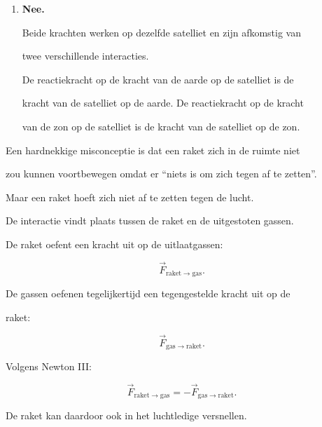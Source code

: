 \documentclass{ximera}
\begin{document}
\begin{oefening}{\oefB\ESS}
\begin{oplossing}
\begin{enumerate}
  \[\vec F_{\mathrm{auto}\rightarrow\mathrm{aanhangwagen}} = -\vec F_{\mathrm{aanhangwagen}\rightarrow\mathrm{auto}}.\]

  \item \textbf{Nee.}

  Beide krachten werken op dezelfde satelliet en zijn afkomstig van

  twee verschillende interacties.

  De reactiekracht op de kracht van de aarde op de satelliet is de

  kracht van de satelliet op de aarde. De reactiekracht op de kracht

  van de zon op de satelliet is de kracht van de satelliet op de zon.

\end{enumerate}

\end{oplossing}

\end{oefening}






Een hardnekkige misconceptie is dat een raket zich in de ruimte niet

zou kunnen voortbewegen omdat er ``niets is om zich tegen af te zetten''.

Maar een raket hoeft zich niet af te zetten tegen de lucht.

De interactie vindt plaats tussen de raket en de uitgestoten gassen.

De raket oefent een kracht uit op de uitlaatgassen:

\[\vec F_{\mathrm{raket}\rightarrow\mathrm{gas}}.\]

De gassen oefenen tegelijkertijd een tegengestelde kracht uit op de

raket:

\[\vec F_{\mathrm{gas}\rightarrow\mathrm{raket}}.\]

Volgens Newton III:

\[\boxed{ \vec F_{\mathrm{raket}\rightarrow\mathrm{gas}} = - \vec F_{\mathrm{gas}\rightarrow\mathrm{raket}}. }\]

De raket kan daardoor ook in het luchtledige versnellen.
\end{document}
